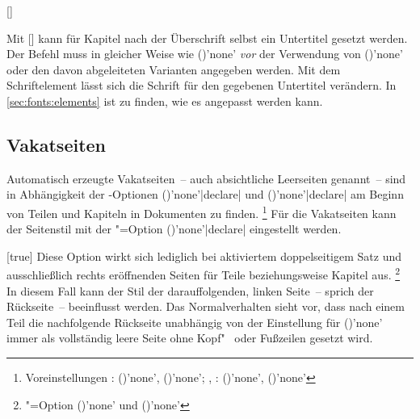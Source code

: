 \begin{Declaration*}{}
\begin{Declaration*}{}
\begin{Declaration*}{}
\begin{Declaration}[v2.06]{[]}
\begin{Declaration}[v2.06]{}
\printdeclarationlist%
%
%
%
%
Mit [] kann für Kapitel nach 
der Überschrift selbst ein Untertitel gesetzt werden. Der Befehl muss in 
gleicher Weise wie ()'none' 
\emph{vor} der Verwendung von ()'none' oder 
den davon abgeleiteten Varianten angegeben werden. Mit dem Schriftelement 
 lässt sich die Schrift für den gegebenen Untertitel 
verändern. In \autoref{sec:fonts:elements} ist zu finden, wie es angepasst 
werden kann.
\end{Declaration}
\end{Declaration}


\subsection{Vakatseiten}
%
%
Automatisch erzeugte Vakatseiten~-- auch absichtliche Leerseiten genannt~-- 
sind in Abhängigkeit der 
\KOMAScript-Optionen ()'none'|declare| 
und ()'none'|declare| am 
Beginn von Teilen und Kapiteln in Dokumenten zu finden.%
\footnote{%
  Voreinstellungen
  : 
  ()'none', 
  ()'none';
  , : 
  ()'none', 
  ()'none'%
}
Für die Vakatseiten kann der Seitenstil mit der \KOMAScript"=Option 
()'none'|declare| 
eingestellt werden.

\begin{Declaration}{}[true]%
\printdeclarationlist%
%
%
%
%
%
%
Diese Option wirkt sich lediglich bei aktiviertem doppelseitigem Satz und 
ausschließlich rechts eröffnenden Seiten für Teile beziehungsweise Kapitel
aus.%
\footnote{%
  \KOMAScript"=Option ()'none' und 
  ()'none'%
}
In diesem Fall kann der Stil der darauffolgenden, linken Seite~-- sprich der 
Rückseite~-- beeinflusst werden. Das Normalverhalten sieht vor, dass nach einem 
Teil die nachfolgende Rückseite unabhängig von der Einstellung für 
()'none' immer als vollständig 
leere Seite ohne Kopf"~ oder Fußzeilen gesetzt wird.


\end{Declaration}
\end{Declaration*}
\end{Declaration*}
\end{Declaration*}
